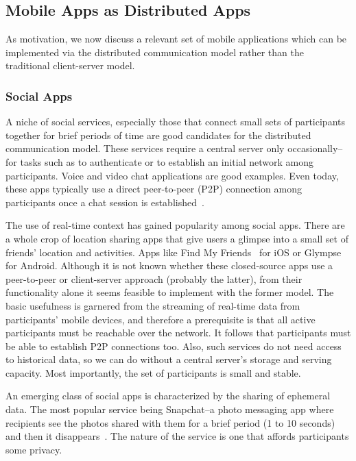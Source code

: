 \documentclass[prodmode]{acmlarge}
\begin{document}
\subsection{Mobile Apps as Distributed Apps}
As motivation, we now discuss a relevant set of mobile applications which can be implemented via the distributed communication model rather than the traditional client-server model.

\subsubsection{Social Apps}
A niche of social services, especially those that connect small sets of participants together for brief periods of time are good candidates for the distributed communication model. These services require a central server only occasionally--for tasks such as to authenticate or to establish an initial network among participants. Voice and video chat applications are good examples. Even today, these apps typically use a direct peer-to-peer (P2P) connection among participants once a chat session is established~\cite{SkypeStudy,GoogleTalkLibrary}.

The use of real-time context has gained popularity among social apps. There are a whole crop of location sharing apps that give users a glimpse into a small set of friends' location and activities. Apps like Find My Friends~\cite{FindMyFriends} for iOS or Glympse~\cite{Glympse} for Android. Although it is not known whether these closed-source apps use a peer-to-peer or client-server approach (probably the latter), from their functionality alone it seems feasible to implement with the former model. The basic usefulness is garnered from the streaming of real-time data from participants' mobile devices, and therefore a prerequisite is that all active participants must be reachable over the network. It follows that participants must be able to establish P2P connections too. Also, such services do not need access to historical data, so we can do without a central server's storage and serving capacity. Most importantly, the set of participants is small and stable.

An emerging class of social apps is characterized by the sharing of ephemeral data. The most popular service being Snapchat--a photo messaging app where recipients see the photos shared with them for a brief period (1 to 10 seconds) and then it disappears~\cite{Snapchat}. The nature of the service is one that affords participants some privacy.
\end{document}
